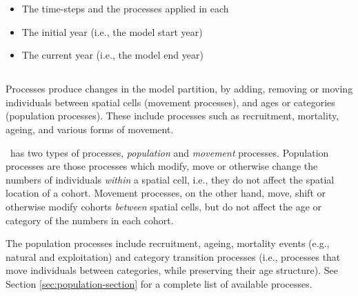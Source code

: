 \begin{itemize}
  \item The time-steps and the processes applied in each
  \item The initial year (i.e., the model start year)
  \item The current year (i.e., the model end year)
\end{itemize}

%

\subsection{}

Processes produce changes in the model partition, by adding, removing or moving individuals between spatial cells (movement processes), and ages or categories (population processes). These include processes such as recruitment, mortality, ageing, and various forms of movement.

\SPM\ has two types of processes, \emph{population} and \emph{movement} processes. Population processes are those processes which modify, move or otherwise change the numbers of individuals \emph{within} a spatial cell, i.e., they do not affect the spatial location of a cohort. Movement processes, on the other hand, move, shift or otherwise modify cohorts \emph{between} spatial cells, but do not affect the age or category of the numbers in each cohort. 

The population processes include recruitment, ageing,  mortality events (e.g., natural and exploitation) and category transition processes (i.e., processes that move individuals between categories, while preserving their age structure). See Section \ref{sec:population-section} for a complete list of available processes.

